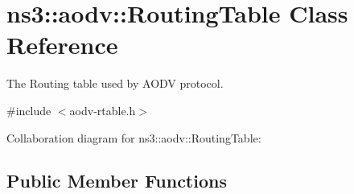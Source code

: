 \hypertarget{classns3_1_1aodv_1_1RoutingTable}{}\section{ns3\+:\+:aodv\+:\+:Routing\+Table Class Reference}
\label{classns3_1_1aodv_1_1RoutingTable}


The Routing table used by A\+O\+DV protocol.  




{\ttfamily \#include $<$aodv-\/rtable.\+h$>$}



Collaboration diagram for ns3\+:\+:aodv\+:\+:Routing\+Table\+:
\subsection*{Public Member Functions}
